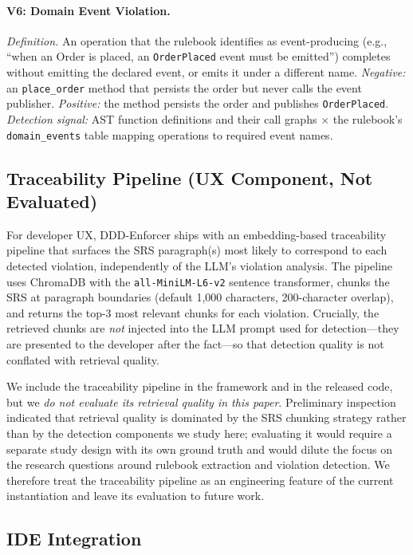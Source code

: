 \documentclass[smallextended]{svjour3}
\begin{document}
\paragraph{V6: Domain Event Violation.}
\emph{Definition.} An operation that the rulebook identifies as event-producing (e.g., ``when an Order is placed, an \texttt{OrderPlaced} event must be emitted'') completes without emitting the declared event, or emits it under a different name.
\emph{Negative:} an \texttt{place\_order} method that persists the order but never calls the event publisher.
\emph{Positive:} the method persists the order and publishes \texttt{OrderPlaced}.
\emph{Detection signal:} AST function definitions and their call graphs $\times$ the rulebook's \texttt{domain\_events} table mapping operations to required event names.

\subsection{Traceability Pipeline (UX Component, Not Evaluated)}
\label{sec:arch_traceability}

For developer UX, DDD-Enforcer ships with an embedding-based traceability pipeline that surfaces the SRS paragraph(s) most likely to correspond to each detected violation, independently of the LLM's violation analysis.
The pipeline uses ChromaDB with the \texttt{all-MiniLM-L6-v2} sentence transformer, chunks the SRS at paragraph boundaries (default 1{,}000 characters, 200-character overlap), and returns the top-3 most relevant chunks for each violation.
Crucially, the retrieved chunks are \emph{not} injected into the LLM prompt used for detection---they are presented to the developer after the fact---so that detection quality is not conflated with retrieval quality.

We include the traceability pipeline in the framework and in the released code, but we \emph{do not evaluate its retrieval quality in this paper}.
Preliminary inspection indicated that retrieval quality is dominated by the SRS chunking strategy rather than by the detection components we study here; evaluating it would require a separate study design with its own ground truth and would dilute the focus on the research questions around rulebook extraction and violation detection.
We therefore treat the traceability pipeline as an engineering feature of the current instantiation and leave its evaluation to future work.

\subsection{IDE Integration}
\label{sec:arch_ide}
\end{document}
